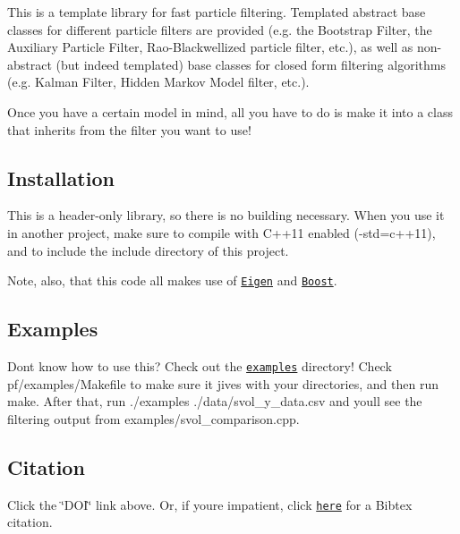 \href{https://zenodo.org/badge/latestdoi/130237492}{\tt }

This is a template library for fast particle filtering. Templated abstract base classes for different particle filters are provided (e.\+g. the Bootstrap Filter, the Auxiliary Particle Filter, Rao-\/\+Blackwellized particle filter, etc.), as well as non-\/abstract (but indeed templated) base classes for closed form filtering algorithms (e.\+g. Kalman Filter, Hidden Markov Model filter, etc.).

Once you have a certain model in mind, all you have to do is make it into a class that inherits from the filter you want to use!

\subsection*{Installation}

This is a header-\/only library, so there is no building necessary. When you use it in another project, make sure to compile with C++11 enabled ({\ttfamily -\/std=c++11}), and to include the {\ttfamily include} directory of this project.

Note, also, that this code all makes use of \href{http://eigen.tuxfamily.org/}{\tt Eigen} and \href{https://www.boost.org/}{\tt Boost}.

\subsection*{Examples}

Don\textquotesingle{}t know how to use this? Check out the \href{https://github.com/tbrown122387/pf/tree/master/examples}{\tt {\ttfamily examples}} directory! Check {\ttfamily pf/examples/\+Makefile} to make sure it jives with your directories, and then run {\ttfamily make}. After that, run {\ttfamily ./examples ./data/svol\+\_\+y\+\_\+data.csv} and you\textquotesingle{}ll see the filtering output from {\ttfamily examples/svol\+\_\+comparison.\+cpp}.

\subsection*{Citation}

Click the \char`\"{}\+D\+O\+I\char`\"{} link above. Or, if you\textquotesingle{}re impatient, click \href{https://zenodo.org/record/2633289/export/hx}{\tt \textquotesingle{}here\textquotesingle{}} for a Bibtex citation. 
